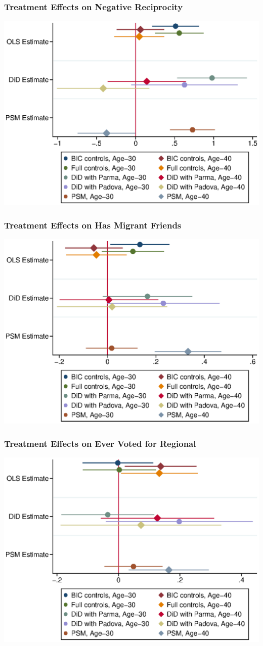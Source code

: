 \begin{frame}
	\frametitle{Treatment Effects on Negative Reciprocity} 
	\includegraphics[scale=0.8]{../../../output/image/coefplot-reciprocity2-adult}

\end{frame}

\begin{frame}
	\frametitle{Treatment Effects on Has Migrant Friends} 
	\includegraphics[scale=0.8]{../../../output/image/coefplot-MigrFriend-adult}

\end{frame}

\begin{frame}
	\frametitle{Treatment Effects on Ever Voted for Regional} 
	\includegraphics[scale=0.8]{../../../output/image/coefplot-votedRegional-adult}

\end{frame}

